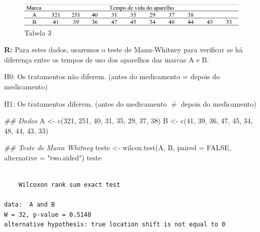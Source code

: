 \documentclass[
  letterpaper,
  DIV=11,
  numbers=noendperiod]{scrartcl}
\newenvironment{Shaded}{\begin{snugshade}}{\end{snugshade}}
\newcommand{\AttributeTok}[1]{\textcolor[rgb]{0.40,0.45,0.13}{#1}}
\newcommand{\ConstantTok}[1]{\textcolor[rgb]{0.56,0.35,0.01}{#1}}
\newcommand{\DecValTok}[1]{\textcolor[rgb]{0.68,0.00,0.00}{#1}}
\newcommand{\DocumentationTok}[1]{\textcolor[rgb]{0.37,0.37,0.37}{\textit{#1}}}
\newcommand{\FunctionTok}[1]{\textcolor[rgb]{0.28,0.35,0.67}{#1}}
\newcommand{\NormalTok}[1]{\textcolor[rgb]{0.00,0.23,0.31}{#1}}
\newcommand{\OtherTok}[1]{\textcolor[rgb]{0.00,0.23,0.31}{#1}}
\newcommand{\StringTok}[1]{\textcolor[rgb]{0.13,0.47,0.30}{#1}}
\begin{document}
\begin{figure}[H]

{\centering \includegraphics{imgs/q3-tabela.png}

}

\caption{Tabela 3}

\end{figure}%

\textbf{R:} Para estes dados, usaremos o teste de Mann-Whitney para
verificar se há diferença entre os tempos de uso dos aparelhos das
marcas A e B.

H0: Os tratamentos não diferem. (antes do medicamento = depois do
medicamento)

H1: Os tratamentos diferem. (antes do medicamento \(\neq\) depois do
medicamento)

\begin{Shaded}
\begin{Highlighting}[]
\DocumentationTok{\#\# Dados}
\NormalTok{A }\OtherTok{\textless{}{-}} \FunctionTok{c}\NormalTok{(}\DecValTok{321}\NormalTok{, }\DecValTok{251}\NormalTok{, }\DecValTok{40}\NormalTok{, }\DecValTok{31}\NormalTok{, }\DecValTok{35}\NormalTok{, }\DecValTok{29}\NormalTok{, }\DecValTok{37}\NormalTok{, }\DecValTok{38}\NormalTok{)}
\NormalTok{B }\OtherTok{\textless{}{-}} \FunctionTok{c}\NormalTok{(}\DecValTok{41}\NormalTok{, }\DecValTok{39}\NormalTok{, }\DecValTok{36}\NormalTok{, }\DecValTok{47}\NormalTok{, }\DecValTok{45}\NormalTok{, }\DecValTok{34}\NormalTok{, }\DecValTok{48}\NormalTok{, }\DecValTok{44}\NormalTok{, }\DecValTok{43}\NormalTok{, }\DecValTok{33}\NormalTok{)}


\DocumentationTok{\#\# Teste de Mann Whitney}
\NormalTok{teste }\OtherTok{\textless{}{-}} \FunctionTok{wilcox.test}\NormalTok{(A, B, }\AttributeTok{paired =} \ConstantTok{FALSE}\NormalTok{, }\AttributeTok{alternative =} \StringTok{"two.sided"}\NormalTok{)}
\NormalTok{teste}
\end{Highlighting}
\end{Shaded}

\begin{verbatim}

    Wilcoxon rank sum exact test

data:  A and B
W = 32, p-value = 0.5148
alternative hypothesis: true location shift is not equal to 0
\end{verbatim}
\end{document}
